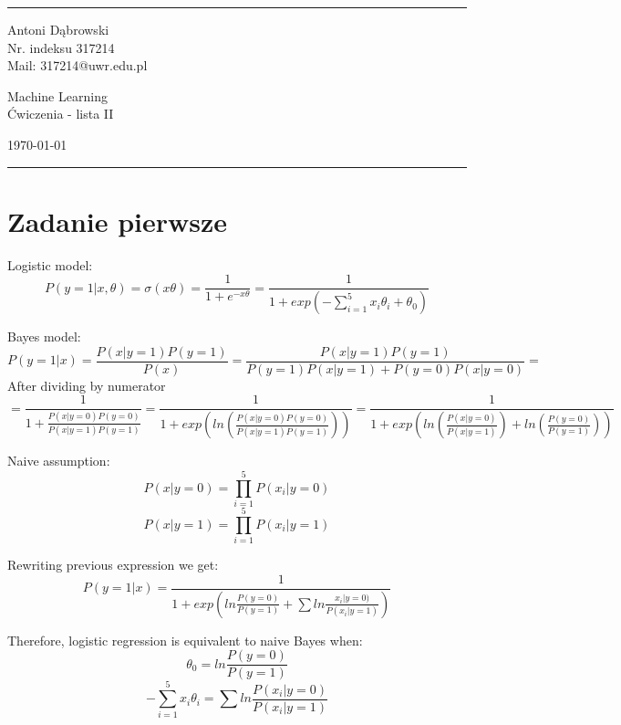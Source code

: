 \documentclass[a4paper]{article}
\begin{document}

\fancyhead[C]{}
\hrule \medskip %
\begin{minipage}{0.295\textwidth} 
\raggedright
\footnotesize
Antoni Dąbrowski \hfill\\   
Nr. indeksu 317214\hfill\\
Mail: 317214@uwr.edu.pl
\end{minipage}
\begin{minipage}{0.4\textwidth} 
\centering 
\large 
Machine Learning\\ 
\normalsize 
Ćwiczenia - lista II\\ 
\end{minipage}
\begin{minipage}{0.295\textwidth} 
\raggedleft
\today\hfill\\
\end{minipage}
\medskip\hrule 
\bigskip



\section{Zadanie pierwsze}
Logistic model:
$$P(y=1|x,\theta)=\sigma(x\theta)=\frac{1}{1+e^{-x\theta}}=\frac{1}{1+exp(-\sum_{i=1}^5x_i\theta_i+\theta_0)}$$

Bayes model:
$$P(y=1|x)=\frac{P(x|y=1)P(y=1)}{P(x)}=\frac{P(x|y=1)P(y=1)}{P(y=1)P(x|y=1)+P(y=0)P(x|y=0)}=$$
After dividing by numerator
$$=\frac{1}{1+\frac{P(x|y=0)P(y=0)}{P(x|y=1)P(y=1)}}=\frac{1}{1+exp(ln(\frac{P(x|y=0)P(y=0)}{P(x|y=1)P(y=1)}))}=\frac{1}{1+exp(ln(\frac{P(x|y=0)}{P(x|y=1)})+ln(\frac{P(y=0)}{P(y=1)}))}$$

Naive assumption:
$$P(x|y=0)=\prod_{i=1}^5P(x_i|y=0)$$
$$P(x|y=1)=\prod_{i=1}^5P(x_i|y=1)$$

Rewriting previous expression we get:
$$P(y=1|x)=\frac{1}{1+exp(ln\frac{P(y=0)}{P(y=1)}+\sum ln\frac{x_i|y=0)}{P(x_i|y=1)})}$$

Therefore, logistic regression is equivalent to naive Bayes when:
$$\theta_0=ln\frac{P(y=0)}{P(y=1)}$$
$$-\sum_{i=1}^5x_i\theta_i=\sum ln\frac{P(x_i|y=0)}{P(x_i|y=1)}$$
\end{document}
